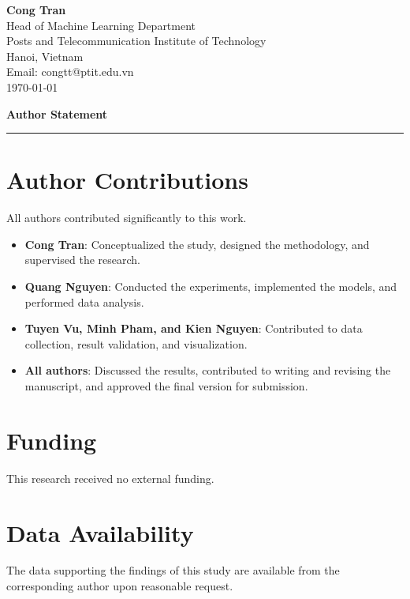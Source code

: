 \documentclass[11pt,a4paper]{article} %
\begin{document}
\begin{flushright}
    \textbf{Cong Tran} \\
    Head of Machine Learning Department \\
    Posts and Telecommunication Institute of Technology \\
    Hanoi, Vietnam \\
    Email: congtt@ptit.edu.vn \\
    \today
\end{flushright}

\vspace{2em}

\begin{center}
    {\huge \textbf{Author Statement}} \\
    \vspace{1em}
    \hrule
    \vspace{1.5em}
\end{center}

\section*{Author Contributions}
All authors contributed significantly to this work.
\begin{itemize}[leftmargin=*, noitemsep]
    \item \textbf{Cong Tran}: Conceptualized the study, designed the methodology, and supervised the research.
    \item \textbf{Quang Nguyen}: Conducted the experiments, implemented the models, and performed data analysis.
    \item \textbf{Tuyen Vu, Minh Pham, and Kien Nguyen}: Contributed to data collection, result validation, and visualization.
    \item \textbf{All authors}: Discussed the results, contributed to writing and revising the manuscript, and approved the final version for submission.
\end{itemize}

\section*{Funding}
This research received no external funding.

\section*{Data Availability}
The data supporting the findings of this study are available from the corresponding author upon reasonable request.
\end{document}
